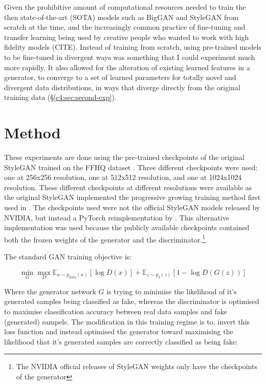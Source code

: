 Given the prohibitive amount of computational resources needed to train the then state-of-the-art (SOTA) models such as BigGAN \citep{brock2018large} and StyleGAN \citep{karras2019style} from scratch at the time, and the increasingly common practice of fine-tuning and transfer learning being used by creative people who wanted to work with high fidelity models (CITE). 
Instead of training from scratch, using pre-trained models to be fine-tuned in divergent ways was something that I could experiment much more rapidly. 
It also allowed for the alteration of existing learned features in a generator, to converge to a set of learned parameters for totally novel and divergent data distributions, in ways that diverge directly from the original training data (\S \ref{c4:sec:second-exp}). 


\section{Method}
\label{c4:sec:method}

These experiments are done using the pre-trained checkpoints of the original StyleGAN trained on the FFHQ dataset \citep{karras2019style}. 
Three different checkpoints were used: one at 256x256 resolution, one at 512x512 resolution, and one at 1024x1024 resolution. 
These different checkpoints at different resolutions were available as the original StyleGAN implemented the progressive growing training method first used in \cite{karras2017progressive}.
The checkpoints used were not the official StyleGAN models released by NVIDIA, but instead a PyTorch reimplementation by \cite{rosinality2019style}.
This alternative implementation was used because the publicly available checkpoints contained both the frozen weights of the generator and the discriminator.\footnote{The NVIDIA official releases of StyleGAN weights only have the checkpoints of the generator}.

The standard GAN training objective is:

\begin{equation} 
\min_{G}\max_{D}\mathbb{E}_{x\sim p_{\text{data}}(x)}[\log{D(x)}] +  \mathbb{E}_{z\sim p_{\text{z}}(z)}[1 - \log{D(G(z))}]
\end{equation}

Where the generator network $G$ is trying to minimise the likelihood of it's generated samples being classified as fake, whereas the discriminator is optimised to maximise classification accuracy between real data samples and fake (generated) sampels.
The modification in this training regime is to, invert this loss function and instead optimised the generator toward maximising the likelihood that it's generated samples are correctly classified as being fake:

